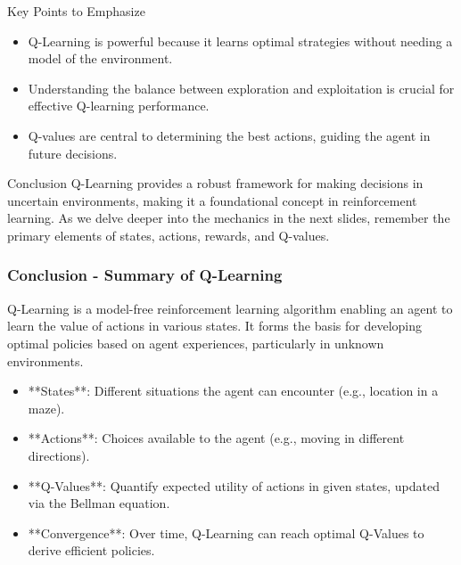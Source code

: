 \documentclass[aspectratio=169]{beamer}
\begin{document}
\begin{frame}[fragile]{Key Points to Emphasize}
  \begin{itemize}
    \item Q-Learning is powerful because it learns optimal strategies without needing a model of the environment.
    \item Understanding the balance between exploration and exploitation is crucial for effective Q-learning performance.
    \item Q-values are central to determining the best actions, guiding the agent in future decisions.
  \end{itemize}
\end{frame}

\begin{frame}[fragile]{Conclusion}
  Q-Learning provides a robust framework for making decisions in uncertain environments, making it a foundational concept in reinforcement learning. As we delve deeper into the mechanics in the next slides, remember the primary elements of states, actions, rewards, and Q-values.
\end{frame}

\begin{frame}[fragile]
    \frametitle{Conclusion - Summary of Q-Learning}
    Q-Learning is a model-free reinforcement learning algorithm enabling an agent to learn the value of actions in various states. It forms the basis for developing optimal policies based on agent experiences, particularly in unknown environments.
    
    \begin{itemize}
        \item **States**: Different situations the agent can encounter (e.g., location in a maze).
        \item **Actions**: Choices available to the agent (e.g., moving in different directions).
        \item **Q-Values**: Quantify expected utility of actions in given states, updated via the Bellman equation.
        \item **Convergence**: Over time, Q-Learning can reach optimal Q-Values to derive efficient policies.
    \end{itemize}
\end{frame}
\end{document}
